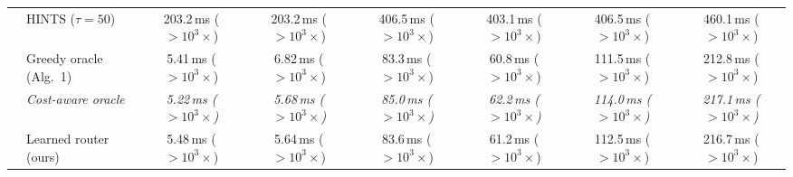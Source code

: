 {\begin{tabular}{llcccccc}
 & HINTS ($\tau{=}50$) & 203.2\,ms ($>10^{3}\times$) & 203.2\,ms ($>10^{3}\times$) & 406.5\,ms ($>10^{3}\times$) & 403.1\,ms ($>10^{3}\times$) & 406.5\,ms ($>10^{3}\times$) & 460.1\,ms ($>10^{3}\times$) \\
 & Greedy oracle (Alg.~1) & 5.41\,ms ($>10^{3}\times$) & 6.82\,ms ($>10^{3}\times$) & 83.3\,ms ($>10^{3}\times$) & 60.8\,ms ($>10^{3}\times$) & 111.5\,ms ($>10^{3}\times$) & 212.8\,ms ($>10^{3}\times$) \\
 & \textit{Cost-aware oracle} & \textit{5.22\,ms ($>10^{3}\times$)} & \textit{5.68\,ms ($>10^{3}\times$)} & \textit{85.0\,ms ($>10^{3}\times$)} & \textit{62.2\,ms ($>10^{3}\times$)} & \textit{114.0\,ms ($>10^{3}\times$)} & \textit{217.1\,ms ($>10^{3}\times$)} \\
 & Learned router (ours) & 5.48\,ms ($>10^{3}\times$) & 5.64\,ms ($>10^{3}\times$) & 83.6\,ms ($>10^{3}\times$) & 61.2\,ms ($>10^{3}\times$) & 112.5\,ms ($>10^{3}\times$) & 216.7\,ms ($>10^{3}\times$) \\
\bottomrule
\end{tabular}}
\newcommand{\cawctolanisoC}{
\begin{tabular}{llcccccc}
\toprule
Solver & Method & $\varepsilon{=}10^{-2}$ & $\varepsilon{=}10^{-3}$ & $\varepsilon{=}h^2$ & $\varepsilon{=}10^{-5}$ & $\varepsilon{=}10^{-6}$ & $\varepsilon{=}10^{-8}$ \\ \midrule
\end{tabular}}
